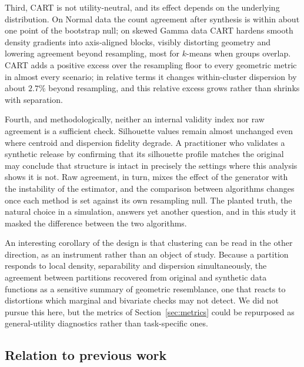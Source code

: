 \documentclass[pdflatex,referee]{sn-jnl}
\begin{document}
Third, CART is not utility-neutral, and its effect depends on the underlying
distribution. On Normal data the count agreement after synthesis is within
about one point of the bootstrap null; on skewed Gamma data CART hardens smooth
density gradients into axis-aligned blocks, visibly distorting geometry and
lowering agreement beyond resampling, most for $k$-means when groups overlap.
CART adds a positive excess over the resampling floor to every geometric
metric in almost every scenario; in relative terms it changes within-cluster
dispersion by about $2.7\%$ beyond resampling, and this relative excess grows
rather than shrinks with separation.

Fourth, and methodologically, neither an internal validity index nor raw
agreement is a sufficient check. Silhouette values remain almost unchanged
even where centroid and dispersion fidelity degrade. A practitioner who
validates a synthetic release by confirming that its silhouette profile
matches the original may conclude that structure is intact in precisely the
settings where this analysis shows it is not. Raw agreement, in turn, mixes
the effect of the generator with the instability of the estimator, and the
comparison between algorithms changes once each method is set against its own
resampling null. The planted truth, the natural choice in a simulation,
answers yet another question, and in this study it masked the difference
between the two algorithms.

An interesting corollary of the design is that clustering can be read in the
other direction, as an instrument rather than an object of study. Because a
partition responds to local density, separability and dispersion
simultaneously, the agreement between partitions recovered from original and
synthetic data functions as a sensitive summary of geometric resemblance, one
that reacts to distortions which marginal and bivariate checks may not detect.
We did not pursue this here, but the metrics of Section~\ref{sec:metrics} could
be repurposed as general-utility diagnostics rather than task-specific ones.

\subsection{Relation to previous work}
\end{document}
